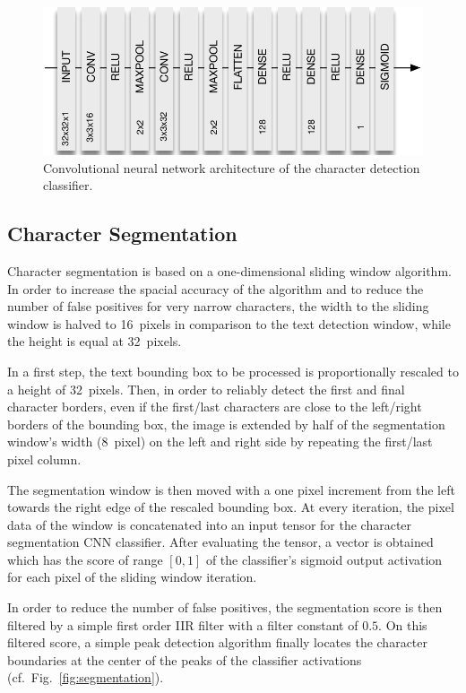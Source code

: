 \documentclass[12pt]{article}
\newcommand\figref[1]{Fig.~\ref{fig:#1}}
\begin{document}
\begin{figure}[ht]
  \centering
  \includegraphics[scale=0.75]{fig/Detection_CNN}
  \caption
  {
    Convolutional neural network architecture of the character detection classifier.
  }
  \label{fig:detection_cnn}
\end{figure}

\subsection{Character Segmentation}
Character segmentation is based on a one-dimensional sliding window algorithm. In order to
increase the spacial accuracy of the algorithm and to reduce the number of false positives
for very narrow characters, the width to the sliding window is halved to 16~pixels in comparison
to the text detection window, while the height is equal at 32~pixels.

In a first step, the text bounding box to be processed is proportionally rescaled to a height of 32~pixels.
Then, in order to reliably detect the first and final character borders, even if the first/last
characters are close to the left/right borders of the bounding box, the image is extended by
half of the segmentation window's width (8~pixel) on the left and right side by repeating the first/last
pixel column.

The segmentation window is then moved with a one pixel increment from the left towards the right
edge of the rescaled bounding box. At every iteration, the pixel data of the window is concatenated
into an input tensor for the character segmentation CNN classifier. After evaluating the
tensor, a vector is obtained which has the score of range $[0,1]$ of the classifier's sigmoid output activation
for each pixel of the sliding window iteration.

In order to reduce the number of false positives, the segmentation score is then filtered by
a simple first order IIR filter \cite{Infinite55:online} with a filter constant of $0.5$. On this
filtered score, a simple peak detection algorithm finally locates the character boundaries at
the center of the peaks of the classifier activations (cf.~\figref{segmentation}).
\end{document}
